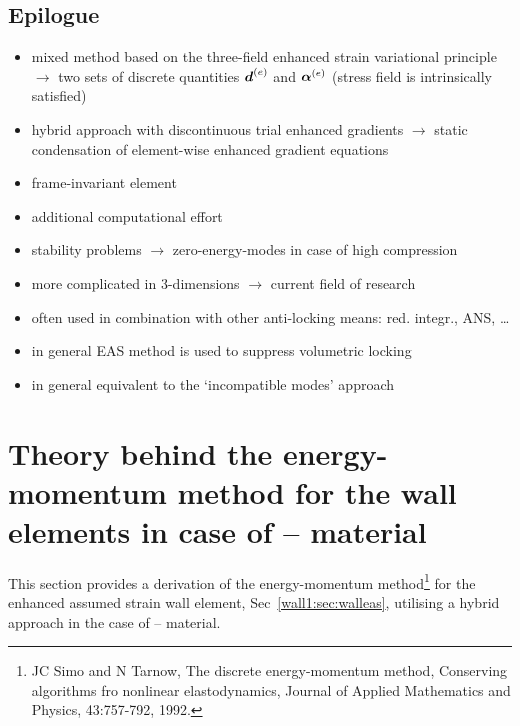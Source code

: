 \subsection{Epilogue}

\begin{itemize}
\item mixed method based on the three-field enhanced strain variational
  principle $\to$ two sets of discrete quantities $\boldsymbol{d}^{(e)}$ and
  $\boldsymbol{\alpha}^{(e)}$ (stress field is intrinsically satisfied)
\item hybrid approach with discontinuous trial enhanced gradients $\to$ 
  static condensation of element-wise enhanced gradient equations
\item frame-invariant element
\item additional computational effort
\item stability problems $\to$ zero-energy-modes in case of high compression
\item more complicated in 3-dimensions $\to$ current field of research
\item often used in combination with other anti-locking means: red.\@
  integr.\@, ANS, \ldots
\item in general EAS method is used to suppress volumetric locking
\item in general equivalent to the `incompatible modes' approach
\end{itemize}


\section{Theory behind the energy-momentum method for the wall elements in
case of -- material}

This section provides a derivation of the energy-momentum method\footnote{JC
 Simo and N Tarnow, The discrete energy-momentum method, Conserving algorithms
 fro nonlinear elastodynamics, Journal of Applied Mathematics and Physics, 43:757-792, 1992.}
 for the enhanced assumed strain wall element, \cf{}
Sec~\ref{wall1:sec:walleas},  utilising a hybrid 
approach in the case of -- material.

